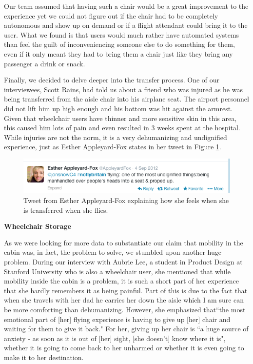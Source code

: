 Our team assumed that having such a chair would be a great improvement to the experience yet we could not figure out if the chair had to be completely autonomous and show up on demand or if a flight attendant could bring it to the user. What we found is that users would much rather have automated systems than feel the guilt of inconveniencing someone else to do something for them, even if it only meant they had to bring them a chair just like they bring any passenger a drink or snack. 

Finally, we decided to delve deeper into the transfer process. One of our interviewees, Scott Rains, had told us about a friend who was injured as he was being transferred from the aisle chair into his airplane seat. The airport personnel did not lift him up high enough and his bottom was hit against the armrest. Given that wheelchair users have thinner and more sensitive skin in this area, this caused him lots of pain and even resulted in 3 weeks spent at the hospital. While injuries are not the norm, it is a very dehumanizing and undignified experience, just as Esther Appleyard-Fox states in her tweet in Figure \ref{fig:MobilityTweet.png}. 


\begin{figure}[h]
  \centering
     \includegraphics[width=12cm]{images/MobilityTweet.png}
   \caption{Tweet from Esther Appleyard-Fox explaining how she feels when she is transferred when she flies. }
  \label{fig:MobilityTweet.png}
\end{figure}


\textbf{Wheelchair Storage}

As we were looking for more data to substantiate our claim that mobility in the cabin was, in fact, the problem to solve, we stumbled upon another huge problem. During our interview with Aubrie Lee, a student in Product Design at Stanford University who is also a wheelchair user, she mentioned that while mobility inside the cabin is a problem, it is such a short part of her experience that she hardly remembers it as being painful. Part of this is due to the fact that when she travels with her dad he carries her down the aisle which I am sure can be more comforting than dehumanizing. However, she emphasized that``the most emotional part of [her] flying experience is having to give up [her] chair and waiting for them to give it back." For her, giving up her chair is ``a huge source of anxiety - as soon as it is out of [her] sight, [she doesn't] know where it is", whether it is going to come back to her unharmed or whether it is even going to make it to her destination. 

